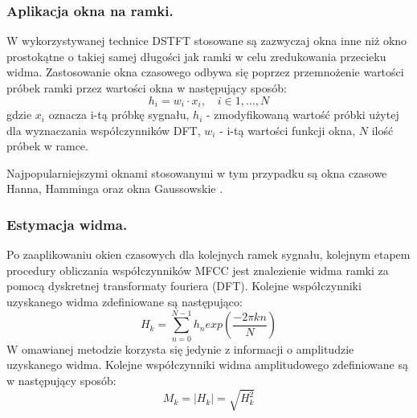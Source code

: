 \subsubsection{Aplikacja okna na ramki.}
W wykorzystywanej technice DSTFT stosowane są zazwyczaj okna inne niż okno prostokątne o takiej samej długości jak ramki w celu zredukowania przecieku widma. Zastosowanie okna czasowego odbywa się poprzez przemnożenie wartości próbek ramki przez wartości okna w następujący sposób:
\begin{equation}
  h_i = w_i \cdot x_i, \quad i \in {1,...,N}
\end{equation}
gdzie $x_i$ oznacza i-tą próbkę sygnału, $h_i$ - zmodyfikowaną wartość próbki użytej dla wyznaczania współczynników DFT, $w_i$ - i-tą wartości funkcji okna, $N$ ilość próbek w ramce. 

Najpopularniejszymi oknami stosowanymi w tym przypadku są okna czasowe Hanna, Hamminga oraz okna Gaussowskie \cite{fosr}.

\subsubsection{Estymacja widma.}
\label{stft}
Po zaaplikowaniu okien czasowych dla kolejnych ramek sygnału, kolejnym etapem procedury obliczania współczynników MFCC jest znalezienie widma ramki za pomocą dyskretnej transformaty fouriera (DFT). Kolejne współczynniki uzyskanego widma zdefiniowane są następująco:
\begin{equation}
  H_k = \sum^{N-1}_{n=0} h_n exp(\frac{-2\pi kn}{N} )
\end{equation}
W omawianej metodzie korzysta się jedynie z informacji o amplitudzie uzyskanego widma. Kolejne współczynniki widma amplitudowego zdefiniowane są w następujący sposób:
\begin{equation}
  M_k = |H_k| = \sqrt{H_k^2}
\end{equation}

